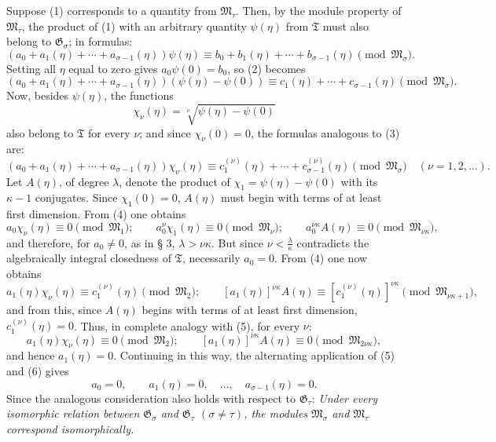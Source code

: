 \documentclass[11pt]{article}
\begin{document}
Suppose (1) corresponds to a quantity from $\mathfrak M_\tau$. Then, by the
module property of $\mathfrak M_\tau$, the product of (1) with an arbitrary
quantity $\psi(\eta)$ from $\mathfrak T$ must also belong to
$\mathfrak G_\sigma$; in formulas:
\begin{equation}
(a_0+a_1(\eta)+\cdots+a_{\sigma-1}(\eta))\psi(\eta)
\equiv b_0+b_1(\eta)+\cdots+b_{\sigma-1}(\eta)
\pmod{\mathfrak M_\sigma}.
\tag{2}
\end{equation}
Setting all $\eta$ equal to zero gives $a_0\psi(0)=b_0$, so (2) becomes
\begin{equation}
(a_0+a_1(\eta)+\cdots+a_{\sigma-1}(\eta))(\psi(\eta)-\psi(0))
\equiv c_1(\eta)+\cdots+c_{\sigma-1}(\eta)
\pmod{\mathfrak M_\sigma}.
\tag{3}
\end{equation}
Now, besides $\psi(\eta)$, the functions
\[
 \chi_\nu(\eta)=\sqrt[\nu]{\psi(\eta)-\psi(0)}
\]
also belong to $\mathfrak T$ for every $\nu$; and since $\chi_\nu(0)=0$, the
formulas analogous to (3) are:
\begin{equation}
(a_0+a_1(\eta)+\cdots+a_{\sigma-1}(\eta))\chi_\nu(\eta)
\equiv c_1^{(\nu)}(\eta)+\cdots+c_{\sigma-1}^{(\nu)}(\eta)
\pmod{\mathfrak M_\sigma}
\quad(\nu=1,2,\ldots).
\tag{4}
\end{equation}
Let $A(\eta)$, of degree $\lambda$, denote the product of
$\chi_1=\psi(\eta)-\psi(0)$ with its $\kappa-1$ conjugates. Since
$\chi_1(0)=0$, $A(\eta)$ must begin with terms of at least first dimension. From
(4) one obtains
\begin{equation}
a_0\chi_\nu(\eta)\equiv0\pmod{\mathfrak M_1};\qquad
a_0^\nu\chi_1(\eta)\equiv0\pmod{\mathfrak M_\nu};\qquad
a_0^{\nu\kappa}A(\eta)\equiv0\pmod{\mathfrak M_{\nu\kappa}},
\tag{5}
\end{equation}
and therefore, for $a_0\ne0$, as in § 3, $\lambda>\nu\kappa$. But since
$\nu<\frac{\lambda}{\kappa}$ contradicts the algebraically integral closedness
of $\mathfrak T$, necessarily $a_0=0$. From (4) one now obtains
\begin{equation}
a_1(\eta)\chi_\nu(\eta)\equiv c_1^{(\nu)}(\eta)\pmod{\mathfrak M_2};\qquad
[a_1(\eta)]^{\nu\kappa}A(\eta)
\equiv[c_1^{(\nu)}(\eta)]^{\nu\kappa}\pmod{\mathfrak M_{\nu\kappa+1}},
\tag{6}
\end{equation}
and from this, since $A(\eta)$ begins with terms of at least first dimension,
$c_1^{(\nu)}(\eta)=0$. Thus, in complete analogy with (5), for every $\nu$:
\[
 a_1(\eta)\chi_\nu(\eta)\equiv0\pmod{\mathfrak M_2};\qquad
 [a_1(\eta)]^{\nu\kappa}A(\eta)\equiv0\pmod{\mathfrak M_{2\nu\kappa}},
\]
and hence $a_1(\eta)=0$. Continuing in this way, the alternating application of
(5) and (6) gives
\[
 a_0=0,\qquad a_1(\eta)=0,\quad \ldots,\quad a_{\sigma-1}(\eta)=0.
\]
Since the analogous consideration also holds with respect to $\mathfrak G_\tau$:
\emph{Under every isomorphic relation between $\mathfrak G_\sigma$ and
$\mathfrak G_\tau$ $(\sigma\ne\tau)$, the modules $\mathfrak M_\sigma$ and
$\mathfrak M_\tau$ correspond isomorphically.}
\end{document}
